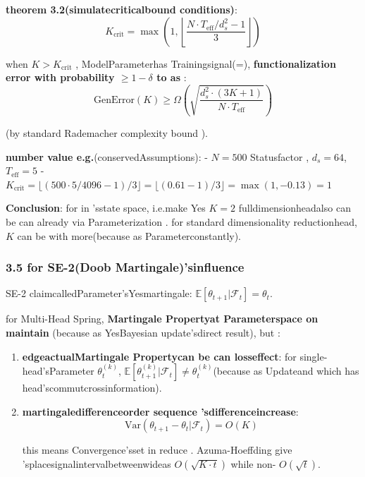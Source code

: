 \documentclass[
  12pt,
]{article}
\begin{document}
\textbf{theorem  3.2(simulatecriticalbound conditions)}: 
\[\boxed{K_{\text{crit}} = \max\left(1, \left\lfloor \frac{N \cdot T_{\text{eff}} / d_s^2 - 1}{3} \right\rfloor \right)}\]

when  \(K > K_{\text{crit}}\)
, ModelParameterhas Trainingsignal(=), \textbf{functionalization error with probability \(\geq 1 - \delta\)
to as }: 
\[\text{GenError}(K) \geq \Omega\left(\sqrt{\frac{d_s^2 \cdot (3K + 1)}{N \cdot T_{\text{eff}}}}\right)\]

(by standard  Rademacher complexity bound ). 

\textbf{number value e.g.}(conservedAssumptions): - \(N = 500\)
Statusfactor , \(d_s = 64\), \(T_{\text{eff}} = 5\) -
\(K_{\text{crit}} = \lfloor (500 \cdot 5 / 4096 - 1) / 3 \rfloor = \lfloor (0.61 - 1) / 3 \rfloor = \max(1, -0.13) = 1\)

\textbf{Conclusion}: for in 'sstate space, i.e.make Yes \(K = 2\)
fulldimensionheadalso can be can already via Parameterization . for standard dimensionality reductionhead, \(K\)
can be with more(because as Parameterconstantly). 

\subsubsection{3.5 for  SE-2(Doob
Martingale)'sinfluence }\label{ux5bf9-se-2doob-martingaleux7684ux5f71ux54cd}

SE-2
claimcalledParameter'sYesmartingale: \(\mathbb{E}[\theta_{t+1} | \mathcal{F}_t] = \theta_t\). 

for  Multi-Head
Spring, \textbf{Martingale Propertyat Parameterspace on maintain }(because as YesBayesian update'sdirect result), but : 

\begin{enumerate}
\def\labelenumi{\arabic{enumi}.}
\item
  \textbf{edgeactualMartingale Propertycan be can losseffect}: for single-head'sParameter
  \(\theta_t^{(k)}\), \(\mathbb{E}[\theta_{t+1}^{(k)} | \mathcal{F}_t] \neq \theta_t^{(k)}\)(because as Updateand which has head'scommutcrossinformation). 
\item
  \textbf{martingaledifferenceorder sequence 'sdifferenceincrease}: 
  \[\text{Var}(\theta_{t+1} - \theta_t | \mathcal{F}_t) = O(K)\]

  this means Convergence'sset in reduce . Azuma-Hoeffding give 'splacesignalintervalbetweenwideas 
  \(O(\sqrt{K \cdot t})\) while non- \(O(\sqrt{t})\). 
\end{enumerate}
\end{document}
